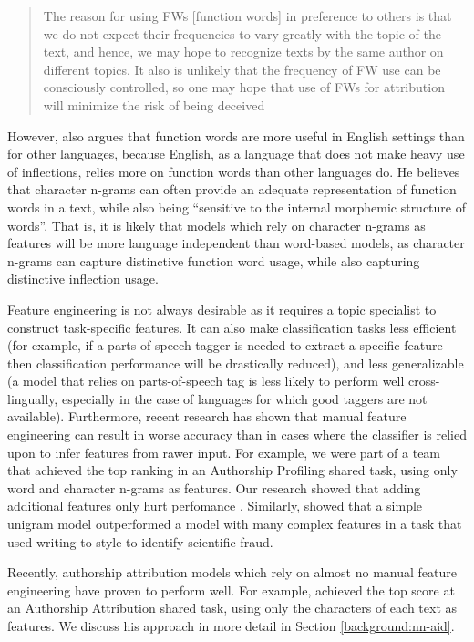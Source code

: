 \begin{quote}
The reason for using FWs [function words] in preference to others is that we do not expect their frequencies to vary greatly with the topic of the text, and hence, we may hope to recognize texts by the same author on different topics. It also is unlikely that the frequency of FW use can be consciously controlled, so one may hope that use of FWs for attribution will minimize the risk of being deceived    
\end{quote}

However, \citet{kestemont2014function} also argues that function words are more useful in English settings than for other languages, because English, as a language that does not make heavy use of inflections, relies more on function words than other languages do. He believes that character n-grams can often provide an adequate representation of function words in a text, while also being ``sensitive to the internal morphemic structure of words''. That is, it is likely that models which rely on character n-grams as features will be more language independent than word-based models, as character n-grams can capture distinctive function word usage, while also capturing distinctive inflection usage.

Feature engineering is not always desirable as it requires a topic specialist to construct task-specific features. It can also make classification tasks less efficient (for example, if a parts-of-speech tagger is needed to extract a specific feature then classification performance will be drastically reduced), and less generalizable (a model that relies on parts-of-speech tag is less likely to perform well cross-lingually, especially in the case of languages for which good taggers are not available). Furthermore, recent research has shown that manual feature engineering can result in worse accuracy than in cases where the classifier is relied upon to infer features from rawer input. For example, we were part of a team that achieved the top ranking in an Authorship Profiling shared task, using only word and character n-grams as features. Our research showed that adding additional features only hurt perfomance \cite{basile2017ngram}. Similarly, \citet{braud2017writing} showed that a simple unigram model outperformed a model with many complex features in a task that used writing to style to identify scientific fraud.

Recently, authorship attribution models which rely on almost no manual feature engineering have proven to perform well. For example, \citet{bagnall2015author} achieved the top score at an Authorship Attribution shared task, using only the characters of each text as features. We discuss his approach in more detail in Section \ref{background:nn-aid}.


